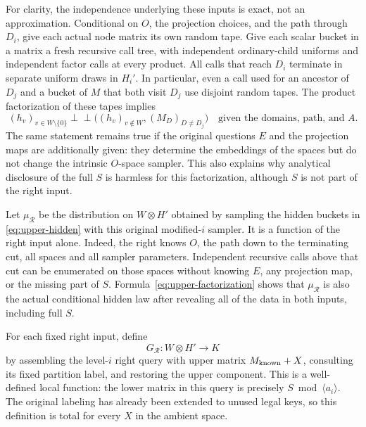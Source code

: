 

For clarity, the independence underlying these inputs is exact, not an
approximation.  Conditional on $O$, the projection choices, and the path
through $D_i$, give each actual node matrix its own random tape.  Give each
scalar bucket in a matrix a fresh recursive call tree, with independent
ordinary-child uniforms and independent factor calls at every product.
All calls that reach $D_i$ terminate in separate uniform draws in
$H_i'$.  In particular, even a call used for an ancestor of $D_j$ and a
bucket of $M$ that both visit $D_j$ use disjoint random tapes.
The product factorization of these tapes implies
\begin{equation}\label{eq:upper-factorization}
 (h_v)_{v\in W\setminus\{0\}}\mathrel{\perp\!\!\!\perp}
 \bigl((h_v)_{v\notin W},(M_D)_{D\ne D_j}\bigr)
 \quad\text{given the domains, path, and }A.
\end{equation}
The same statement remains true if the original questions $E$ and the
projection maps are additionally given: they determine the embeddings of
the spaces but do not change the intrinsic $O$-space sampler.  This also
explains why analytical disclosure of the full $S$ is harmless for this
factorization, although $S$ is not part of the right input.

Let $\mu_{\mathcal R}$ be the distribution on $W\otimes H'$ obtained by
sampling the hidden buckets in \eqref{eq:upper-hidden} with this original
modified-$i$ sampler.  It is a function of the right input alone.  Indeed,
the right knows $O$, the path down to the terminating cut, all spaces and
all sampler parameters.  Independent recursive calls above that cut can
be enumerated on those spaces without knowing $E$, any projection map,
or the missing part of $S$.  Formula~\eqref{eq:upper-factorization} shows
that $\mu_{\mathcal R}$ is also the actual conditional hidden law after
revealing all of the data in both inputs, including full $S$.

For each fixed right input, define
\begin{equation}\label{eq:upper-G}
 G_{\mathcal R}:W\otimes H'\longrightarrow K
\end{equation}
by assembling the level-$i$ right query with upper matrix
$M_{\rm known}+X$, consulting its fixed partition label, and restoring
the upper component.  This is a well-defined local function: the lower
matrix in this query is precisely $S\bmod\langle a_i\rangle$.
The original labeling has already been extended to unused legal keys, so
this definition is total for every $X$ in the ambient space.

